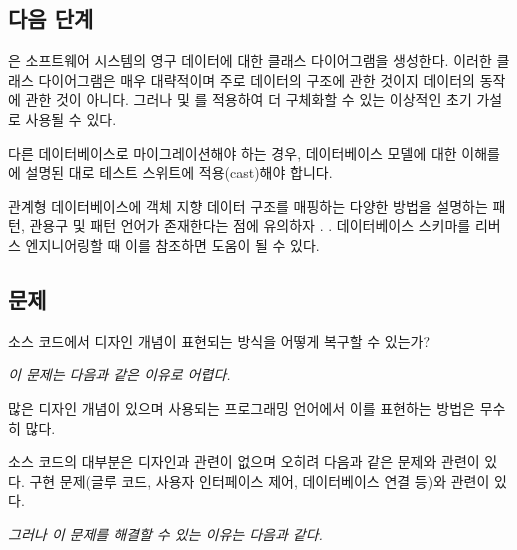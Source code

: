 \documentclass[a4paper,10pt,twoside]{book}
\begin{document}
\subsection*{다음 단계}

은 소프트웨어 시스템의 영구 데이터에 대한 클래스 다이어그램을 생성한다. 이러한 클래스 다이어그램은 매우 대략적이며 주로 데이터의 구조에 관한 것이지 데이터의 동작에 관한 것이 아니다. 그러나  및 를 적용하여 더 구체화할 수 있는 이상적인 초기 가설로 사용될 수 있다.

다른 데이터베이스로 마이그레이션해야 하는 경우, 데이터베이스 모델에 대한 이해를 에 설명된 대로 테스트 스위트에 적용(cast)해야 합니다.

관계형 데이터베이스에 객체 지향 데이터 구조를 매핑하는 다양한 방법을 설명하는 패턴, 관용구 및 패턴 언어가 존재한다는 점에 유의하자 \cite{Brow96d}. \cite{Kell98a}. 데이터베이스 스키마를 리버스 엔지니어링할 때 이를 참조하면 도움이 될 수 있다.



\subsection*{문제}

소스 코드에서 디자인 개념이 표현되는 방식을 어떻게 복구할 수 있는가?

\emph{이 문제는 다음과 같은 이유로 어렵다.}

\begin{bulletlist}

\item 많은 디자인 개념이 있으며 사용되는 프로그래밍 언어에서 이를 표현하는 방법은 무수히 많다.

\item 소스 코드의 대부분은 디자인과 관련이 없으며 오히려 다음과 같은 문제와 관련이 있다. 구현 문제(글루 코드, 사용자 인터페이스 제어, 데이터베이스 연결 등)와 관련이 있다.
\end{bulletlist}

\emph{그러나 이 문제를 해결할 수 있는 이유는 다음과 같다.}
\end{document}
